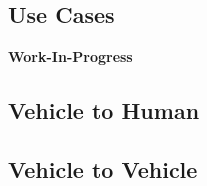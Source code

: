 \documentclass{llncs}
\begin{document}
{		%
		
		\subsection{Use Cases}
			\label{ss:use-cases}

			\textbf{Work-In-Progress}
			
%			
		
			
			
		\subsection{Vehicle to Human}
			\label{ss:V2H}
			
%			
			
		
		
		\subsection{Vehicle to Vehicle}
			\label{ss:V2V}
%			

}
\end{document}
